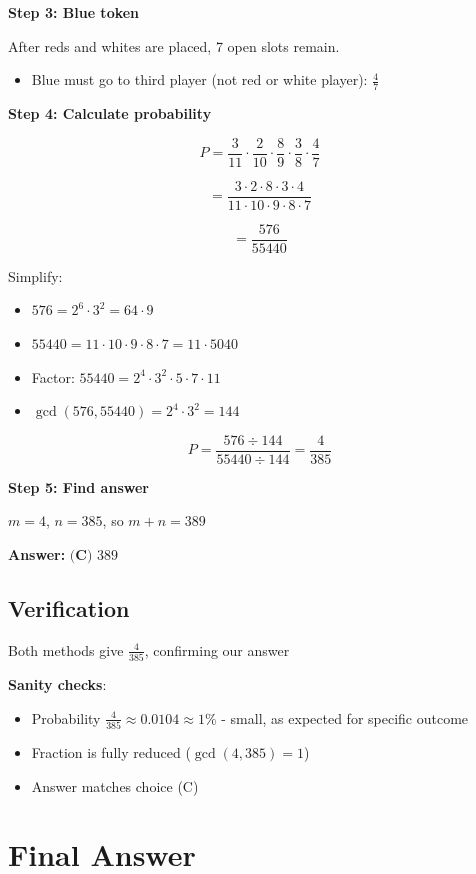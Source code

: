 \documentclass[12pt]{article}
\begin{document}
\textbf{Step 3: Blue token}

After reds and whites are placed, 7 open slots remain.

\begin{itemize}
    \item Blue must go to third player (not red or white player): $\frac{4}{7}$
\end{itemize}

\textbf{Step 4: Calculate probability}

\[P = \frac{3}{11} \cdot \frac{2}{10} \cdot \frac{8}{9} \cdot \frac{3}{8} \cdot \frac{4}{7}\]

\[= \frac{3 \cdot 2 \cdot 8 \cdot 3 \cdot 4}{11 \cdot 10 \cdot 9 \cdot 8 \cdot 7}\]

\[= \frac{576}{55440}\]

Simplify:
\begin{itemize}
    \item $576 = 2^6 \cdot 3^2 = 64 \cdot 9$
    \item $55440 = 11 \cdot 10 \cdot 9 \cdot 8 \cdot 7 = 11 \cdot 5040$
    \item Factor: $55440 = 2^4 \cdot 3^2 \cdot 5 \cdot 7 \cdot 11$
    \item $\gcd(576, 55440) = 2^4 \cdot 3^2 = 144$
\end{itemize}

\[P = \frac{576 \div 144}{55440 \div 144} = \frac{4}{385}\]

\textbf{Step 5: Find answer}

$m = 4$, $n = 385$, so $m + n = 389$

\textbf{Answer: } $\boxed{\textbf{(C) } 389}$

\subsection*{Verification}

Both methods give $\frac{4}{385}$, confirming our answer \checkmark

\textbf{Sanity checks}:
\begin{itemize}
    \item Probability $\frac{4}{385} \approx 0.0104 \approx 1\%$ - small, as expected for specific outcome \checkmark
    \item Fraction is fully reduced ($\gcd(4, 385) = 1$) \checkmark
    \item Answer matches choice (C) \checkmark
\end{itemize}

\section*{Final Answer}
\end{document}
